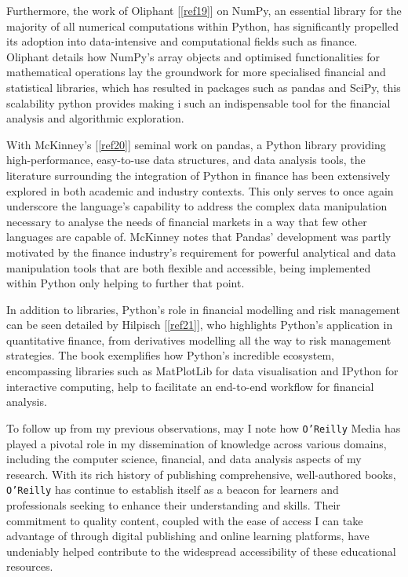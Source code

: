 \documentclass{article}
\begin{document}
Furthermore, the work of Oliphant [\ref{ref19}] on NumPy, an essential library for the majority of all numerical computations within Python, has significantly propelled its adoption into data-intensive and computational fields such as finance. Oliphant details how NumPy's array objects and optimised functionalities for mathematical operations lay the groundwork for more specialised financial and statistical libraries, which has resulted in packages such as pandas and SciPy, this scalability python provides making i such an indispensable tool for the financial analysis and algorithmic exploration.\\\vspace{0.3cm}

With McKinney's [\ref{ref20}] seminal work on pandas, a Python library providing high-performance, easy-to-use data structures, and data analysis tools, the literature surrounding the integration of Python in finance has been extensively explored in both academic and industry contexts. This only serves to once again underscore the language's capability to address the complex data manipulation necessary to analyse the needs of financial markets in a way that few other languages are capable of. McKinney notes that Pandas' development was partly motivated by the finance industry's requirement for powerful analytical and data manipulation tools that are both flexible and accessible, being implemented within Python only helping to further that point.\\\vspace{0.3cm}

In addition to libraries, Python's role in financial modelling and risk management can be seen detailed by Hilpisch [\ref{ref21}], who highlights Python's application in quantitative finance, from derivatives modelling all the way to risk management strategies. The book exemplifies how Python's incredible ecosystem, encompassing libraries such as MatPlotLib for data visualisation and IPython for interactive computing, help to facilitate an end-to-end workflow for financial analysis.\\\vspace{0.3cm}

To follow up from my previous observations, may I note how \texttt{O'Reilly} Media has played a pivotal role in my dissemination of knowledge across various domains, including the computer science, financial, and data analysis aspects of my research. With its rich history of publishing comprehensive, well-authored books, \texttt{O'Reilly} has continue to establish itself as a beacon for learners and professionals seeking to enhance their understanding and skills. Their commitment to quality content, coupled with the ease of access I can take advantage of through digital publishing and online learning platforms, have undeniably helped contribute to the widespread accessibility of these educational resources.\\\vspace{0.3cm}
\end{document}
